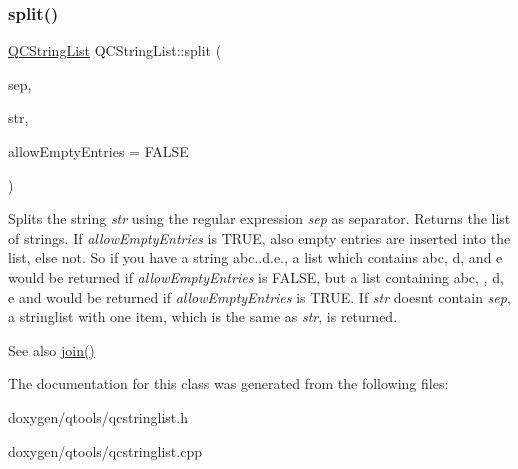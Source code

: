 \subsubsection{\texorpdfstring{split()}{split()}\hspace{0.1cm}{\footnotesize\ttfamily [3/3]}}
{\footnotesize\ttfamily \mbox{\hyperlink{class_q_c_string_list}{Q\+C\+String\+List}} Q\+C\+String\+List\+::split (\begin{DoxyParamCaption}\item[{const \mbox{\hyperlink{class_q_reg_exp}{Q\+Reg\+Exp}} \&}]{sep,  }\item[{const \mbox{\hyperlink{class_q_c_string}{Q\+C\+String}} \&}]{str,  }\item[{bool}]{allow\+Empty\+Entries = {\ttfamily FALSE} }\end{DoxyParamCaption})\hspace{0.3cm}{\ttfamily [static]}}

Splits the string {\itshape str} using the regular expression {\itshape sep} as separator. Returns the list of strings. If {\itshape allow\+Empty\+Entries} is T\+R\+UE, also empty entries are inserted into the list, else not. So if you have a string \textquotesingle{}abc..d.\+e.\textquotesingle{}, a list which contains \textquotesingle{}abc\textquotesingle{}, \textquotesingle{}d\textquotesingle{}, and \textquotesingle{}e\textquotesingle{} would be returned if {\itshape allow\+Empty\+Entries} is F\+A\+L\+SE, but a list containing \textquotesingle{}abc\textquotesingle{}, \textquotesingle{}\textquotesingle{}, \textquotesingle{}d\textquotesingle{}, \textquotesingle{}e\textquotesingle{} and \textquotesingle{}\textquotesingle{} would be returned if {\itshape allow\+Empty\+Entries} is T\+R\+UE. If {\itshape str} doesn\textquotesingle{}t contain {\itshape sep}, a stringlist with one item, which is the same as {\itshape str}, is returned.

\begin{DoxySeeAlso}{See also}
\mbox{\hyperlink{class_q_c_string_list_a6f889e803df00f762cbc6ce37bd9b5c0}{join()}} 
\end{DoxySeeAlso}


The documentation for this class was generated from the following files\+:\begin{DoxyCompactItemize}
\item 
doxygen/qtools/qcstringlist.\+h\item 
doxygen/qtools/qcstringlist.\+cpp\end{DoxyCompactItemize}
